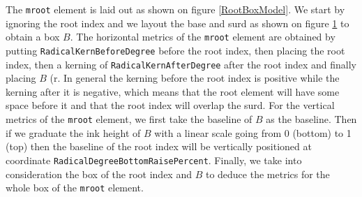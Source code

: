 \begin{figure}
\centering
{}
\label{SquareRootBoxModel}
\end{figure}

The {\tt mroot} element is laid out as shown on figure \ref{RootBoxModel}.
We start by ignoring the root index and we layout the base and surd as
shown on figure \ref{SquareRootBoxModel} to obtain a box $B$.
The horizontal metrics of the {\tt mroot} element are obtained by putting
{\tt RadicalKernBeforeDegree}
before the root index, then placing the root index, then a kerning
of {\tt RadicalKernAfterDegree}
after the root index and finally placing $B$ (r. In general
the kerning before the root index is positive while the kerning after it is
negative,
which means that the root element will have some space before it and that the
root index will overlap the surd.
For the vertical metrics of the {\tt mroot} element, we first take the baseline
of $B$ as the baseline. Then if we graduate the ink height of $B$ with a linear
scale going from 0 (bottom) to 1 (top) then the baseline of the root index will
be vertically positioned at coordinate {\tt RadicalDegreeBottomRaisePercent}.
Finally, we take into consideration the box of the root index and $B$ to deduce
the metrics for the whole box of the {\tt mroot} element.

